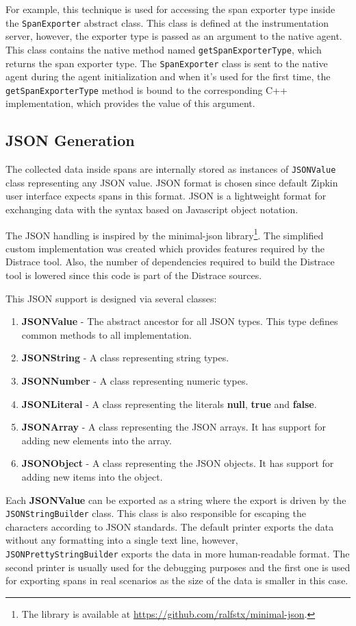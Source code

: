 For example, this technique is used for accessing the span exporter type inside the \texttt{SpanExporter} abstract class. This class is defined at the instrumentation server, however, the exporter type is passed as an argument to the native agent. This class contains the native method named \texttt{getSpanExporterType}, which returns the span exporter type. The \texttt{SpanExporter} class is sent to the native agent during the agent initialization and when it's used for the first time, the \texttt{getSpanExporterType} method is bound to the corresponding C++ implementation, which provides the value of this argument.

\subsection{JSON Generation}
\label{json_gen}

The collected data inside spans are internally stored as instances of \texttt{JSONValue} class representing any JSON value. JSON format is chosen since default Zipkin user interface expects spans in this format. JSON is a lightweight format for exchanging data with the syntax based on Javascript object notation.

The JSON handling is inspired by the minimal-json library\footnote{The library is available at \url{https://github.com/ralfstx/minimal-json}.}. The simplified custom implementation was created which provides features required by the Distrace tool. Also, the number of dependencies required to build the Distrace tool is lowered since this code is part of the Distrace sources.

This JSON support is designed via several classes:
\begin{enumerate}
	\item \textbf{JSONValue} - The abstract ancestor for all JSON types. This type defines common methods to all implementation.
	\item \textbf{JSONString} - A class representing string types.
	\item \textbf{JSONNumber} - A class representing numeric types.
	\item \textbf{JSONLiteral} - A class representing the literals \textbf{null}, \textbf{true} and \textbf{false}.
	\item \textbf{JSONArray} - A class representing the JSON arrays. It has support for adding new elements into the array.
	\item \textbf{JSONObject} - A class representing the JSON objects. It has support for adding new items into the object.
\end{enumerate}

Each \textbf{JSONValue} can be exported as a string where the export is driven by the \texttt{JSONStringBuilder} class. This class is also responsible for escaping the characters according to JSON standards. The default printer exports the data without any formatting into a single text line, however, \texttt{JSONPrettyStringBuilder} exports the data in more human-readable format. The second printer is usually used for the debugging purposes and the first one is used for exporting spans in real scenarios as the size of the data is smaller in this case.


